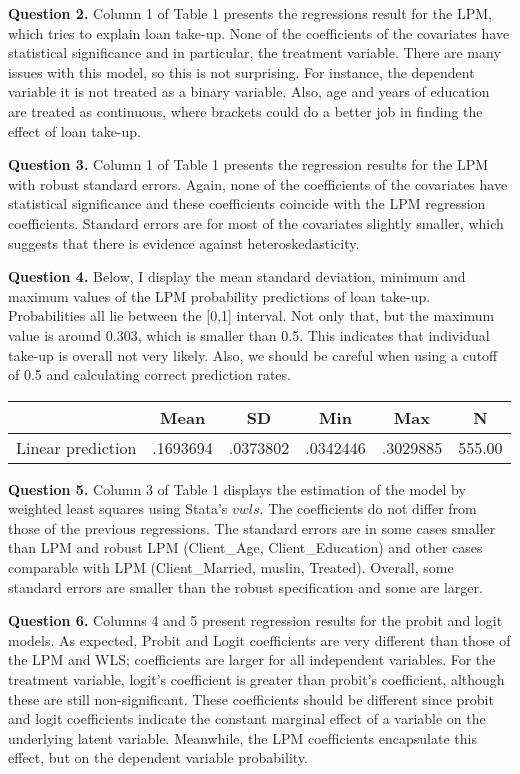 \documentclass{article}
\theoremstyle{definition}
\begin{document}
\textbf{Question 2.} Column 1 of Table 1 presents the regressions result for the LPM, which tries to explain loan take-up. None of the coefficients of the covariates have statistical significance and  in particular, the treatment variable. There are many issues with this model, so this is not surprising. For instance,  the dependent variable it is not treated as a binary variable. Also, age and years of education are treated as continuous, where brackets could do a better job in finding the effect of loan take-up. 

\textbf{Question 3.} Column 1 of Table 1 presents the regression results for the LPM with robust standard errors. Again,  none of the coefficients of the covariates have statistical significance and these coefficients coincide with the LPM regression coefficients. Standard errors are for most of the covariates slightly smaller, which suggests that there is evidence against heteroskedasticity. 

\textbf{Question 4.} Below, I display the mean standard deviation, minimum and maximum values of the LPM probability predictions of loan take-up. Probabilities all lie between the [0,1] interval. Not only that, but the maximum value is around 0.303, which is smaller than 0.5. This indicates that individual take-up is overall not very likely. Also, we should be careful when using a cutoff of 0.5 and calculating correct prediction rates.
\begin{table}[htbp]\centering
{
\def\sym#1{\ifmmode^{#1}\else\(^{#1}\)\fi}
\begin{tabular}{l*{1}{ccccc}}
\hline\hline
                    &        Mean&          SD&         Min&         Max&           N\\
\hline
Linear prediction  & .1693694  & .0373802  & .0342446  & .3029885   &   555.00\\
\hline\hline
\end{tabular}
}
\end{table}

\textbf{Question 5.} Column 3 of Table 1 displays the estimation of the model by weighted least squares using Stata’s $vwls$. The coefficients do not differ from those of the previous regressions. The standard errors are in some cases smaller than LPM and robust LPM (Client\_Age, Client\_Education) and other cases comparable with LPM (Client\_Married, muslin, Treated). Overall, some standard errors are smaller than the robust specification and some are larger. 

\textbf{Question 6.} Columns 4 and 5 present regression results for the probit and logit models. As expected, Probit and Logit coefficients are very different than those of the LPM and WLS; coefficients are larger for all independent variables. For the treatment variable, logit's coefficient is greater than probit's coefficient, although these are still non-significant. 
These coefficients should be different since probit and logit coefficients indicate the constant marginal effect of a variable on the underlying latent variable. Meanwhile, the LPM coefficients encapsulate this effect, but on the dependent variable probability. 
\end{document}
